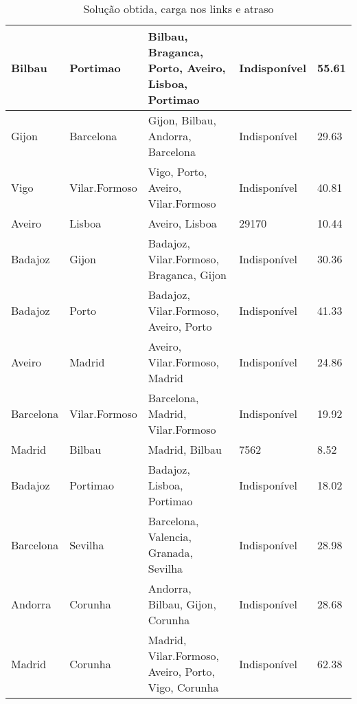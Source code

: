 \begin{table}[!htb]
{\begin{tabular}{|l|l|l|l|l|}
Bilbau & Portimao & Bilbau, Braganca, Porto, Aveiro, Lisboa, Portimao & Indisponível & 55.61 \\ \hline
Gijon & Barcelona & Gijon, Bilbau, Andorra, Barcelona & Indisponível & 29.63 \\ \hline
Vigo & Vilar.Formoso & Vigo, Porto, Aveiro, Vilar.Formoso & Indisponível & 40.81 \\ \hline
Aveiro & Lisboa & Aveiro, Lisboa & 29170 & 10.44 \\ \hline
Badajoz & Gijon & Badajoz, Vilar.Formoso, Braganca, Gijon & Indisponível & 30.36 \\ \hline
Badajoz & Porto & Badajoz, Vilar.Formoso, Aveiro, Porto & Indisponível & 41.33 \\ \hline
Aveiro & Madrid & Aveiro, Vilar.Formoso, Madrid & Indisponível & 24.86 \\ \hline
Barcelona & Vilar.Formoso & Barcelona, Madrid, Vilar.Formoso & Indisponível & 19.92 \\ \hline
Madrid & Bilbau & Madrid, Bilbau & 7562 & 8.52 \\ \hline
Badajoz & Portimao & Badajoz, Lisboa, Portimao & Indisponível & 18.02 \\ \hline
Barcelona & Sevilha & Barcelona, Valencia, Granada, Sevilha & Indisponível & 28.98 \\ \hline
Andorra & Corunha & Andorra, Bilbau, Gijon, Corunha & Indisponível & 28.68 \\ \hline
Madrid & Corunha & Madrid, Vilar.Formoso, Aveiro, Porto, Vigo, Corunha & Indisponível & 62.38 \\ \hline
\end{tabular}}
\caption[]{Solução obtida, carga nos links e atraso}
\end{table}


